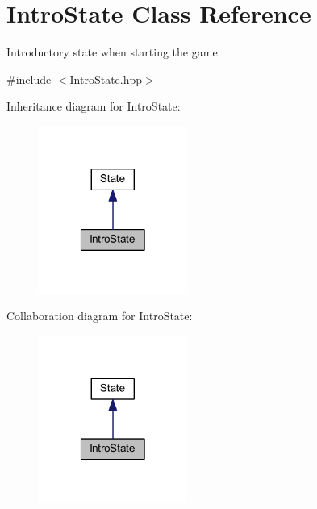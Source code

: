 \hypertarget{class_intro_state}{\section{Intro\-State Class Reference}
\label{class_intro_state}
}


Introductory state when starting the game.  




{\ttfamily \#include $<$Intro\-State.\-hpp$>$}



Inheritance diagram for Intro\-State\-:
\nopagebreak
\begin{figure}[H]
\begin{center}
\leavevmode
\includegraphics[width=138pt]{class_intro_state__inherit__graph}
\end{center}
\end{figure}


Collaboration diagram for Intro\-State\-:
\nopagebreak
\begin{figure}[H]
\begin{center}
\leavevmode
\includegraphics[width=138pt]{class_intro_state__coll__graph}
\end{center}
\end{figure}
